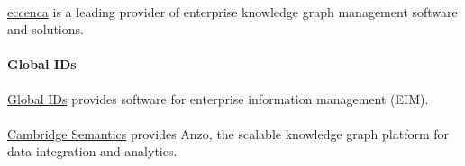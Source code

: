 \paragraph{\eccenca}
\label{eccenca}

\href{https://eccenca.com/}{eccenca} is a leading provider of enterprise knowledge graph management
software and solutions.

\paragraph{Global IDs}
\label{globalids}

\href{https://www.globalids.com/}{Global IDs} provides software for enterprise information management (EIM).

\paragraph{\cambridgesemantics}
\label{cambridgesemantics}

\href{https://www.cambridgesemantics.com/}{Cambridge Semantics} provides Anzo,
the scalable knowledge graph platform for data integration and analytics.




